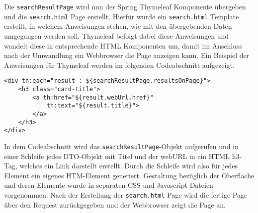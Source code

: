 Die \texttt{searchResultPage} wird nun der Spring Thymeleaf Komponente übergeben und die \texttt{search.html} Page erstellt.
Hierfür wurde ein \texttt{search.html} Template erstellt, in welchem Anweisungen stehen, wie mit den übergebenden Daten umgegangen werden soll.
Thymeleaf befolgt dabei diese Anweisungen und wandelt diese in entsprechende HTML Komponenten um, damit im Anschluss nach der Umwandlung ein Webbrowser die Page anzeigen kann.
Ein Beispiel der Anweisungen für Thymeleaf werden im folgenden Codeabschnitt aufgezeigt.
\begin{lstlisting}
<div th:each="result : ${searchResultPage.resultsOnPage}">
	<h3 class="card-title">
		<a th:href="${result.webUrl.href}"
			th:text="${result.title}">
		</a>
	</h3>
</div>
\end{lstlisting}
In dem Codeabschnitt wird das \texttt{searchResultPage}-Objekt aufgerufen und in einer Schleife jedes DTO-Objekt mit Titel und der webURL in ein HTML h3-Tag, welches ein Link darstellt erstellt.
Durch die Schleife wird also für jedes Element ein eigenes HTM-Element generiert.
Gestaltung bezüglich der Oberfläche und deren Elemente wurde in separaten CSS und Javascript Dateien vorgenommen.
Nach der Erstellung der \texttt{search.html} Page wird die fertige Page über den Request zurückgegeben und der Webbrowser zeigt die Page an.








